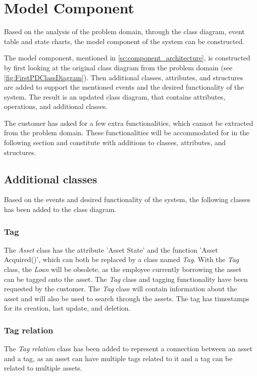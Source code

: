 \section{Model Component} \label{sc:model_component}
Based on the analysis of the problem domain, through the class diagram, event table and state charts, the model component of the system can be constructed.
\par
The model component, mentioned in \autoref{sc:component_architecture}, is constructed by first looking at the original class diagram from the problem domain (see \autoref{fig:FirstPDClassDiagram}). Then additional classes, attributes, and structures are added to support the mentioned events and the desired functionality of the system. The result is an updated class diagram, that contains attributes, operations, and additional classes.
\par
The customer has asked for a few extra functionalities, which cannot be extracted from the problem domain. These functionalities will be accommodated for in the following section and constitute with additions to classes, attributes, and structures.

\subsection{Additional classes}
Based on the events and desired functionality of the system, the following classes has been added to the class diagram. 


\subsubsection{Tag}
The \textit{Asset} class has the attribute 'Asset State' and the function 'Asset Acquired()', which can both be replaced by a class named \textit{Tag}. With the \textit{Tag} class, the \textit{Loan} will be obsolete, as the employee currently borrowing the asset can be tagged onto the asset. The \textit{Tag} class and tagging functionality have been requested by the customer. The \textit{Tag} class will contain information about the asset and will also be used to search through the assets. The tag has timestamps for its creation, last update, and deletion.

\subsubsection{Tag relation}
The \textit{Tag relation} class has been added to represent a connection between an asset and a tag, as an asset can have multiple tags related to it and a tag can be related to multiple assets.

